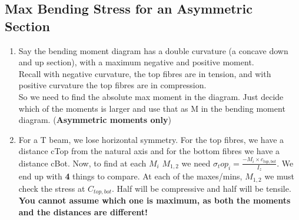 \documentclass[10pt, twocolumn]{report}
\begin{document}
\subsection{Max Bending Stress for an Asymmetric Section}
\begin{enumerate}
  \item Say the bending moment diagram has a double curvature (a concave down and up section), with a maximum negative and positive moment. \\ Recall with negative curvature, the top fibres are in tension, and with positive curvature the top fibres are in compression. \\ So we need to find the absolute max moment in the diagram. Just decide which of the moments is larger and use that as M in the bending moment diagram. (\textbf{Asymmetric moments only})
  \item For a T beam, we lose horizontal symmetry.  For the top fibres, we have a distance cTop from the natural axis and for the bottom fibres we have a distance cBot. Now, to find at each $M_i$ $M_{1,2}$ we need $\sigma_top_i = \frac{-M_i \times c_{top, bot}}{I_z}$. We end up with \textbf{4} things to compare. At each of the maxes/mins, $M_{1,2}$ we must check the stress at $C_{top, bot}$. Half will be compressive and half will be tensile. \textbf{You cannot assume which one is maximum, as both the moments and the distances are different!}\\

\end{enumerate}
\end{document}

